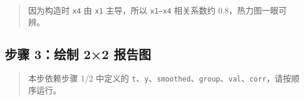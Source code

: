 \begin{Shaded}
\begin{Highlighting}[]

\end{Highlighting}
\end{Shaded}

\begin{quote}
因为构造时 \texttt{x4} 由 \texttt{x1} 主导，所以 \texttt{x1–x4}
相关系数约 0.8，热力图一眼可辨。
\end{quote}

\subsection{步骤 3：绘制 2×2
报告图}\label{ux6b65ux9aa4-3ux7ed8ux5236-22-ux62a5ux544aux56fe}

\begin{quote}
本步依赖步骤 1/2 中定义的
\texttt{t}、\texttt{y}、\texttt{smoothed}、\texttt{group}、\texttt{val}、\texttt{corr}，请按顺序运行。
\end{quote}

